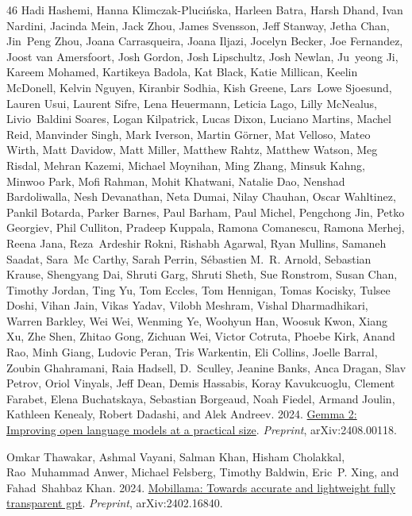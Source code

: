 \documentclass[11pt]{article}
\begin{document}
\begin{thebibliography}{46}
  Hadi Hashemi, Hanna Klimczak-Plucińska, Harleen Batra, Harsh Dhand, Ivan Nardini, Jacinda Mein, Jack Zhou, James Svensson, Jeff Stanway, Jetha Chan, Jin~Peng Zhou, Joana Carrasqueira, Joana Iljazi, Jocelyn Becker, Joe Fernandez, Joost van Amersfoort, Josh Gordon, Josh Lipschultz, Josh Newlan, Ju~yeong Ji, Kareem Mohamed, Kartikeya Badola, Kat Black, Katie Millican, Keelin McDonell, Kelvin Nguyen, Kiranbir Sodhia, Kish Greene, Lars~Lowe Sjoesund, Lauren Usui, Laurent Sifre, Lena Heuermann, Leticia Lago, Lilly McNealus, Livio~Baldini Soares, Logan Kilpatrick, Lucas Dixon, Luciano Martins, Machel Reid, Manvinder Singh, Mark Iverson, Martin Görner, Mat Velloso, Mateo Wirth, Matt Davidow, Matt Miller, Matthew Rahtz, Matthew Watson, Meg Risdal, Mehran Kazemi, Michael Moynihan, Ming Zhang, Minsuk Kahng, Minwoo Park, Mofi Rahman, Mohit Khatwani, Natalie Dao, Nenshad Bardoliwalla, Nesh Devanathan, Neta Dumai, Nilay Chauhan, Oscar Wahltinez, Pankil Botarda, Parker Barnes, Paul Barham, Paul Michel, Pengchong Jin,
  Petko Georgiev, Phil Culliton, Pradeep Kuppala, Ramona Comanescu, Ramona Merhej, Reena Jana, Reza~Ardeshir Rokni, Rishabh Agarwal, Ryan Mullins, Samaneh Saadat, Sara~Mc Carthy, Sarah Perrin, Sébastien M.~R. Arnold, Sebastian Krause, Shengyang Dai, Shruti Garg, Shruti Sheth, Sue Ronstrom, Susan Chan, Timothy Jordan, Ting Yu, Tom Eccles, Tom Hennigan, Tomas Kocisky, Tulsee Doshi, Vihan Jain, Vikas Yadav, Vilobh Meshram, Vishal Dharmadhikari, Warren Barkley, Wei Wei, Wenming Ye, Woohyun Han, Woosuk Kwon, Xiang Xu, Zhe Shen, Zhitao Gong, Zichuan Wei, Victor Cotruta, Phoebe Kirk, Anand Rao, Minh Giang, Ludovic Peran, Tris Warkentin, Eli Collins, Joelle Barral, Zoubin Ghahramani, Raia Hadsell, D.~Sculley, Jeanine Banks, Anca Dragan, Slav Petrov, Oriol Vinyals, Jeff Dean, Demis Hassabis, Koray Kavukcuoglu, Clement Farabet, Elena Buchatskaya, Sebastian Borgeaud, Noah Fiedel, Armand Joulin, Kathleen Kenealy, Robert Dadashi, and Alek Andreev. 2024.
\newblock \href {https://arxiv.org/abs/2408.00118} {Gemma 2: Improving open language models at a practical size}.
\newblock \emph{Preprint}, arXiv:2408.00118.

Omkar Thawakar, Ashmal Vayani, Salman Khan, Hisham Cholakkal, Rao~Muhammad Anwer, Michael Felsberg, Timothy Baldwin, Eric~P. Xing, and Fahad~Shahbaz Khan. 2024.
\newblock \href {https://arxiv.org/abs/2402.16840} {Mobillama: Towards accurate and lightweight fully transparent gpt}.
\newblock \emph{Preprint}, arXiv:2402.16840.


\end{thebibliography}
\end{document}

